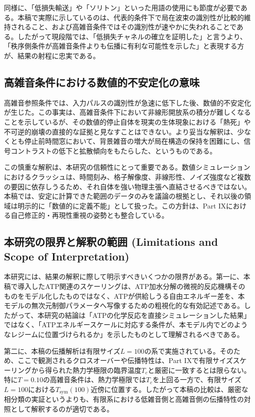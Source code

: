 \documentclass[a4paper,11pt,ja=standard,lualatex]{bxjsarticle}
\begin{document}
同様に、「低損失輸送」や「ソリトン」といった用語の使用にも節度が必要である。本稿で実際に示しているのは、代表的条件下で局在波束の識別性が比較的維持されること、および高雑音条件ではその識別性が速やかに失われることである。したがって現段階では、「低損失チャネルの確立を証明した」と言うより、「秩序側条件が高雑音条件よりも伝播に有利な可能性を示した」と表現する方が、結果の射程に忠実である。

\subsection{高雑音条件における数値的不安定化の意味}
高雑音参照条件では、入力パルスの識別性が急速に低下した後、数値的不安定化が生じた。この事実は、高雑音条件下において非線形開放系の積分が難しくなることを示しているが、その数値的停止自体を現実の生体現象における「熱死」や不可逆的崩壊の直接的な証拠と見なすことはできない。より妥当な解釈は、少なくとも停止前時間窓において、背景雑音の増大が局在構造の保持を困難にし、信号コントラストの低下と拡散傾向をもたらした、というものである。

この慎重な解釈は、本研究の信頼性にとって重要である。数値シミュレーションにおけるクラッシュは、時間刻み、格子解像度、非線形性、ノイズ強度など複数の要因に依存しうるため、それ自体を強い物理主張へ直結させるべきではない。本稿では、安定に計算できた範囲のデータのみを議論の根拠とし、それ以後の領域は明示的に「数値的に定義不能」として扱った。この方針は、Part IXにおける自己修正的・再現性重視の姿勢とも整合している。

\subsection{本研究の限界と解釈の範囲 (Limitations and Scope of Interpretation)}
本研究には、結果の解釈に際して明示すべきいくつかの限界がある。第一に、本稿で導入したATP関連のスケーリングは、ATP加水分解の微視的反応機構そのものをモデル化したものではなく、ATPが供給しうる自由エネルギー差を、本モデルの無次元制御パラメータへ写像するための粗視化的な有効記述である。したがって、本研究の結論は「ATPの化学反応を直接シミュレーションした結果」ではなく、「ATPエネルギースケールに対応する条件が、本モデル内でどのようなレジームに位置づけられるか」を示したものとして理解されるべきである。

第二に、本稿の伝播解析は有限サイズ$L=100$の系で実施されている。そのため、ここで観測されるクロスオーバーや伝播特性は、Part IXで有限サイズスケーリングから得られた熱力学極限の臨界温度$T_c$と厳密に一致するとは限らない。特に$T=0.10$の高雑音条件は、熱力学極限では$T_c$を上回る一方で、有限サイズ$L=100$における$T_{\mathrm{sym}}(100)$近傍に位置する。したがって本稿の比較は、厳密な相分類の実証というよりも、有限系における低雑音側と高雑音側の伝播特性の対照として解釈するのが適切である。
\end{document}
